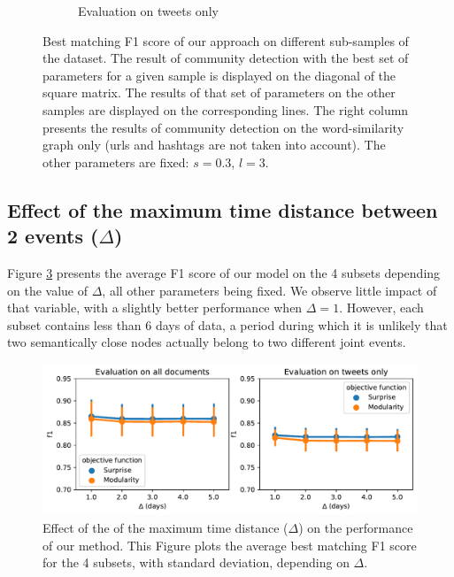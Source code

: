 \begin{figure}
\begin{subfigure}[b]{1\textwidth}
\begin{center}
       \caption{Evaluation on tweets only}
    \label{fig:louvain_macro_tweets}
     \end{center}
\end{subfigure}
\caption[Best matching F1 score of our approach on different sub-samples of the dataset]{Best matching F1 score of our approach on different sub-samples of the dataset. The result of community detection with the best set of parameters for a given sample is displayed on the diagonal of the square matrix. The results of that set of parameters on the other samples are displayed on the corresponding lines. The right column presents the results of community detection on the word-similarity graph only (urls and hashtags are not taken into account). The other parameters are fixed: $s=0.3$, $l=3$.}
\label{fig:louvain_macro}
\end{figure}

\subsection{Effect of the maximum time distance between 2 events ($\Delta$)}
Figure \ref{fig:louvain_macro_days} presents the average F1 score of our model on the 4 subsets depending on the value of $\Delta$, all other parameters being fixed. We observe little impact of that variable, with a slightly better performance when $\Delta=1$. However, each subset contains less than 6 days of data, a period during which it is unlikely that two semantically close nodes actually belong to two different joint events. 

\begin{figure}
    \centering
    \includegraphics[width=1\textwidth]{figures/louvain_macro_days.pdf}
    \caption[Effect of the of the maximum time distance on the performance of our method]{Effect of the of the maximum time distance ($\Delta$) on the performance of our method. This Figure plots the average best matching F1 score for the 4 subsets, with standard deviation, depending on $\Delta$.}
    \label{fig:louvain_macro_days}
\end{figure}
